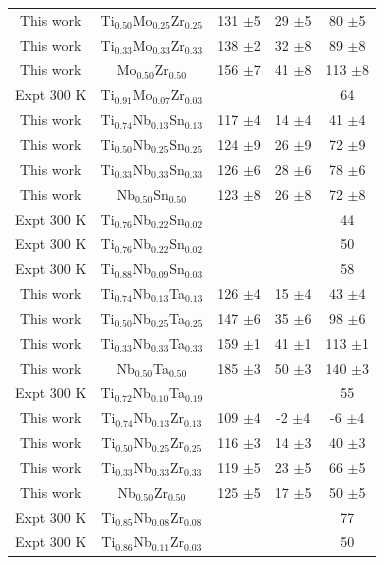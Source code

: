 \begin{longtable}[H]{ c c c c c }
	This work & Ti$_{0.50}$Mo$_{0.25}$Zr$_{0.25}$ & 131 $\pm$5 & 29 $\pm$5 & 80 $\pm$5\\
	This work & Ti$_{0.33}$Mo$_{0.33}$Zr$_{0.33}$ & 138 $\pm$2 & 32 $\pm$8 & 89 $\pm$8\\
	This work & Mo$_{0.50}$Zr$_{0.50}$ & 156 $\pm$7 & 41 $\pm$8 & 113 $\pm$8\\
	Expt 300 K \cite{Mohammed2014} & Ti$_{0.91}$Mo$_{0.07}$Zr$_{0.03}$ & & & 64\\
	This work & Ti$_{0.74}$Nb$_{0.13}$Sn$_{0.13}$ & 117 $\pm$4 & 14 $\pm$4 & 41 $\pm$4\\
	This work & Ti$_{0.50}$Nb$_{0.25}$Sn$_{0.25}$ & 124 $\pm$9 & 26 $\pm$9 & 72 $\pm$9\\
	This work & Ti$_{0.33}$Nb$_{0.33}$Sn$_{0.33}$ & 126 $\pm$6 & 28 $\pm$6 & 78 $\pm$6\\
	This work & Nb$_{0.50}$Sn$_{0.50}$ & 123 $\pm$8 & 26 $\pm$8 & 72 $\pm$8\\
	Expt 300 K \cite{Mohammed2014} & Ti$_{0.76}$Nb$_{0.22}$Sn$_{0.02}$ & & & 44\\
	Expt 300 K \cite{Niinomi2012} & Ti$_{0.76}$Nb$_{0.22}$Sn$_{0.02}$ & & & 50\\
	Expt 300 K \cite{Nozoe2007} & Ti$_{0.88}$Nb$_{0.09}$Sn$_{0.03}$ & & & 58\\
	This work & Ti$_{0.74}$Nb$_{0.13}$Ta$_{0.13}$ & 126 $\pm$4 & 15 $\pm$4 & 43 $\pm$4\\
	This work & Ti$_{0.50}$Nb$_{0.25}$Ta$_{0.25}$ & 147 $\pm$6 & 35 $\pm$6 & 98 $\pm$6\\
	This work & Ti$_{0.33}$Nb$_{0.33}$Ta$_{0.33}$ & 159 $\pm$1 & 41 $\pm$1 & 113 $\pm$1\\
	This work & Nb$_{0.50}$Ta$_{0.50}$ & 185 $\pm$3 & 50 $\pm$3 & 140 $\pm$3\\
	Expt 300 K \cite{Mohammed2014} & Ti$_{0.72}$Nb$_{0.10}$Ta$_{0.19}$ & & & 55\\
	This work & Ti$_{0.74}$Nb$_{0.13}$Zr$_{0.13}$ & 109 $\pm$4 & -2 $\pm$4 & -6 $\pm$4\\
	This work & Ti$_{0.50}$Nb$_{0.25}$Zr$_{0.25}$ & 116 $\pm$3 & 14 $\pm$3 & 40 $\pm$3\\
	This work & Ti$_{0.33}$Nb$_{0.33}$Zr$_{0.33}$ & 119 $\pm$5 & 23 $\pm$5 & 66 $\pm$5\\
	This work & Nb$_{0.50}$Zr$_{0.50}$ & 125 $\pm$5 & 17 $\pm$5 & 50 $\pm$5\\
	Expt 300 K \cite{Mohammed2014} & Ti$_{0.85}$Nb$_{0.08}$Zr$_{0.08}$ & & & 77\\
	Expt 300 K \cite{Mohammed2014} & Ti$_{0.86}$Nb$_{0.11}$Zr$_{0.03}$ & & & 50\\

\end{longtable}
